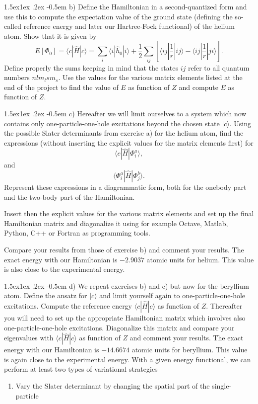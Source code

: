 \documentclass[%
oneside,                 %
final,                   %
10pt]{article}
\makeatletter
\newenvironment{doconceexercise}{}{}
\newcommand\subex{\@startsection{paragraph}{4}{\z@}%
                  {1.5ex\@plus1ex \@minus.2ex}%
                  {-0.5em}%
                  {\normalfont\normalsize\bfseries}}
\makeatother
\begin{document}
\begin{doconceexercise}
\subex{b)}
Define the Hamiltonian in a second-quantized form and use this to
compute the expectation value of the ground state (defining the so-called reference energy and later our Hartree-Fock functional) of the helium atom. 
Show that it is given by
\[
  E[\Phi_0] = \langle c | \hat{H}| c \rangle 
  = \sum_{i} \langle i | \hat{h}_0 | i\rangle+ \frac{1}{2}\sum_{ij}\left[\langle ij |\frac{1}{r}|ij\rangle-\langle ij |\frac{1}{r}|ji\rangle\right].
\]
Define properly the sums keeping in mind that the states $ij$ refer to all
quantum numbers $nlm_lsm_s$.
Use the values for the various matrix elements listed at the end of the project to find the value of $E$
as function of $Z$ and compute $E$ as function of $Z$.

\subex{c)}
Hereafter we will limit ourselves to a system which now contains only one-particle-one-hole
excitations beyond the chosen state $|c\rangle$.
Using the possible Slater determinants from exercise a) for the helium atom,   
find the expressions  (without inserting the explicit values for the matrix elements first) for
\[
\langle c | \hat{H}| \Phi_i^a \rangle,
\] 
and
\[
\langle \Phi_i^a | \hat{H}| \Phi_j^b \rangle.
\]
Represent these expressions in a diagrammatic form, both for the onebody part and the two-body part of the Hamiltonian. 

Insert then the explicit values for the various matrix elements and 
set up the final Hamiltonian matrix and diagonalize it using for example
Octave, Matlab, Python, C++ or Fortran as programming tools.

Compare your results from those of exercise b) and comment your results. 
The exact energy with our Hamiltonian is $-2.9037$ atomic units for helium. This value is also close to the experimental energy.

\subex{d)}
We repeat exercises b) and c) but now for the beryllium atom.
Define the ansatz for $|c\rangle$ and limit yourself again to one-particle-one-hole excitations.   Compute the reference energy 
$\langle c | \hat{H}| c \rangle $ as function of $Z$. Thereafter you will need to set up the appropriate Hamiltonian matrix
which involves also one-particle-one-hole excitations. Diagonalize this matrix
and compare your eigenvalues with  $\langle c | \hat{H}| c \rangle$ as function of $Z$ and comment your results. 
The exact energy with our Hamiltonian is $-14.6674$ atomic units for beryllium. This value is again close to the experimental energy.\newline\newline\newline
With a given energy functional, we can perform at least two types of variational strategies
\begin{enumerate}
\item Vary the Slater determinant by changing the spatial part of the single-particle
\end{enumerate}


\end{doconceexercise}
\end{document}
